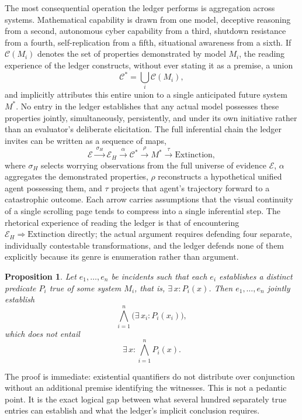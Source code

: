 \documentclass[11pt]{article}
\newtheorem{proposition}{Proposition}
\begin{document}
The most consequential operation the ledger performs is aggregation across systems. Mathematical capability is drawn from one model, deceptive reasoning from a second, autonomous cyber capability from a third, shutdown resistance from a fourth, self-replication from a fifth, situational awareness from a sixth. If $\mathcal{C}(M_i)$ denotes the set of properties demonstrated by model $M_i$, the reading experience of the ledger constructs, without ever stating it as a premise, a union
\[
\mathcal{C}^{\ast} = \bigcup_i \mathcal{C}(M_i),
\]
and implicitly attributes this entire union to a single anticipated future system $M^{\ast}$. No entry in the ledger establishes that any actual model possesses these properties jointly, simultaneously, persistently, and under its own initiative rather than an evaluator's deliberate elicitation. The full inferential chain the ledger invites can be written as a sequence of maps,
\[
\mathcal{E} \xrightarrow{\ \sigma_H\ } \mathcal{E}_H \xrightarrow{\ \alpha\ } \mathcal{C}^{\ast} \xrightarrow{\ \rho\ } M^{\ast} \xrightarrow{\ \tau\ } \text{Extinction},
\]
where $\sigma_H$ selects worrying observations from the full universe of evidence $\mathcal{E}$, $\alpha$ aggregates the demonstrated properties, $\rho$ reconstructs a hypothetical unified agent possessing them, and $\tau$ projects that agent's trajectory forward to a catastrophic outcome. Each arrow carries assumptions that the visual continuity of a single scrolling page tends to compress into a single inferential step. The rhetorical experience of reading the ledger is that of encountering $\mathcal{E}_H \Rightarrow \text{Extinction}$ directly; the actual argument requires defending four separate, individually contestable transformations, and the ledger defends none of them explicitly because its genre is enumeration rather than argument.

\begin{proposition}
Let $e_1, \dots, e_n$ be incidents such that each $e_i$ establishes a distinct predicate $P_i$ true of some system $M_i$, that is, $\exists\, x : P_i(x)$. Then $e_1, \dots, e_n$ jointly establish
\[
\bigwedge_{i=1}^{n} \bigl(\exists\, x_i : P_i(x_i)\bigr),
\]
which does not entail
\[
\exists\, x : \bigwedge_{i=1}^{n} P_i(x).
\]
\end{proposition}

The proof is immediate: existential quantifiers do not distribute over conjunction without an additional premise identifying the witnesses. This is not a pedantic point. It is the exact logical gap between what several hundred separately true entries can establish and what the ledger's implicit conclusion requires.
\end{document}
